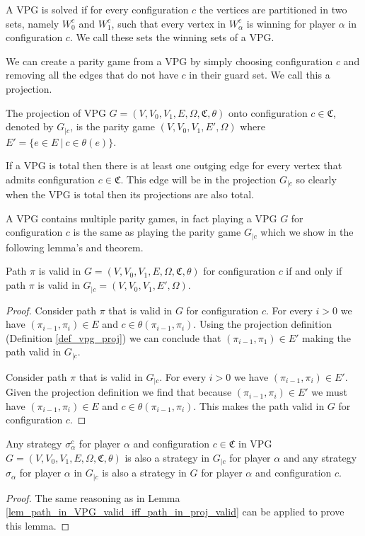 A VPG is solved if for every configuration $c$ the vertices are partitioned in two sets, namely $W_0^c$ and $W_1^c$, such that every vertex in $W_\alpha^c$ is winning for player $\alpha$ in configuration $c$. We call these sets the winning sets of a VPG.

We can create a parity game from a VPG by simply choosing configuration $c$ and removing all the edges that do not have $c$ in their guard set. We call this a projection.

\begin{definition}
	\label{def_vpg_proj}
	The projection of VPG $G = (V,V_0,V_1,E,\Omega, \mathfrak{C},\theta)$ onto configuration $c\in \mathfrak{C}$, denoted by $G_{|c}$, is the parity game $(V,V_0,V_1,E',\Omega)$ where $E' = \{ e \in E\ |\ c \in \theta(e)\}$.
\end{definition}
If a VPG is total then there is at least one outging edge for every vertex that admits configuration $c \in \mathfrak{C}$. This edge will be in the projection $G_{|c}$ so clearly when the VPG is total then its projections are also total.

A VPG contains multiple parity games, in fact playing a VPG $G$ for configuration $c$ is the same as playing the parity game $G_{|c}$ which we show in the following lemma's and theorem.

\begin{lemma}
	\label{lem_path_in_VPG_valid_iff_path_in_proj_valid}
	Path $\pi$ is valid in $G = (V,V_0,V_1,E,\Omega,\mathfrak{C},\theta)$ for configuration $c$ if and only if path $\pi$ is valid in $G_{|c} = (V,V_0,V_1,E',\Omega)$.
	\begin{proof}
		Consider path $\pi$ that is valid in $G$ for configuration $c$. For every $i>0$ we have $(\pi_{i-1},\pi_i) \in E$ and $c \in \theta(\pi_{i-1},\pi_i)$. Using the projection definition (Definition \ref{def_vpg_proj}) we can conclude that $(\pi_{i-1},\pi_1) \in E'$ making the path valid in $G_{|c}$.
		
		Consider path $\pi$ that is valid in $G_{|c}$. For every $i > 0$ we have $(\pi_{i-1},\pi_i) \in E'$. Given the projection definition we find that because $(\pi_{i-1},\pi_i) \in E'$ we must have $(\pi_{i-1},\pi_i) \in E$ and $c \in \theta(\pi_{i-1},\pi_i)$. This makes the path valid in $G$ for configuration $c$.
	\end{proof}
\end{lemma}

\begin{lemma}
	\label{lem_start_in_VPG_valid_iff_start_in_proj_valid}
	Any strategy $\sigma_\alpha^c$ for player $\alpha$ and configuration $c \in \mathfrak{C}$ in VPG $G = (V,V_0,V_1,E,\Omega,\mathfrak{C},\theta)$ is also a strategy in $G_{|c}$ for player $\alpha$ and any strategy $\sigma_\alpha$ for player $\alpha$ in $G_{|c}$ is also a strategy in $G$ for player $\alpha$ and configuration $c$.
	\begin{proof}
		The same reasoning as in Lemma \ref{lem_path_in_VPG_valid_iff_path_in_proj_valid} can be applied to prove this lemma.
	\end{proof}
\end{lemma}

